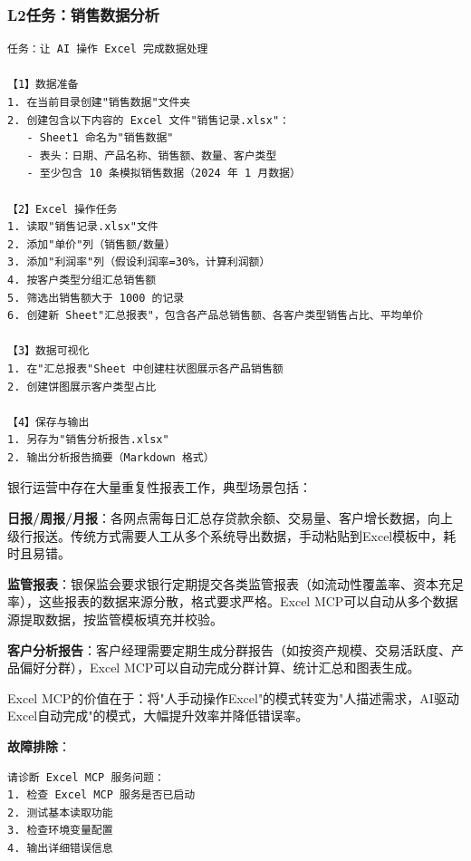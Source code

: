\subsubsection{L2任务：销售数据分析}

\begin{lstlisting}
任务：让 AI 操作 Excel 完成数据处理

【1】数据准备
1. 在当前目录创建"销售数据"文件夹
2. 创建包含以下内容的 Excel 文件"销售记录.xlsx"：
   - Sheet1 命名为"销售数据"
   - 表头：日期、产品名称、销售额、数量、客户类型
   - 至少包含 10 条模拟销售数据（2024 年 1 月数据）

【2】Excel 操作任务
1. 读取"销售记录.xlsx"文件
2. 添加"单价"列（销售额/数量）
3. 添加"利润率"列（假设利润率=30%，计算利润额）
4. 按客户类型分组汇总销售额
5. 筛选出销售额大于 1000 的记录
6. 创建新 Sheet"汇总报表"，包含各产品总销售额、各客户类型销售占比、平均单价

【3】数据可视化
1. 在"汇总报表"Sheet 中创建柱状图展示各产品销售额
2. 创建饼图展示客户类型占比

【4】保存与输出
1. 另存为"销售分析报告.xlsx"
2. 输出分析报告摘要（Markdown 格式）
\end{lstlisting}

\begin{theorybox}[银行运营中的报表自动化需求]
银行运营中存在大量重复性报表工作，典型场景包括：

\textbf{日报/周报/月报}：各网点需每日汇总存贷款余额、交易量、客户增长数据，向上级行报送。传统方式需要人工从多个系统导出数据，手动粘贴到Excel模板中，耗时且易错。

\textbf{监管报表}：银保监会要求银行定期提交各类监管报表（如流动性覆盖率、资本充足率），这些报表的数据来源分散，格式要求严格。Excel MCP可以自动从多个数据源提取数据，按监管模板填充并校验。

\textbf{客户分析报告}：客户经理需要定期生成分群报告（如按资产规模、交易活跃度、产品偏好分群），Excel MCP可以自动完成分群计算、统计汇总和图表生成。

Excel MCP的价值在于：将"人手动操作Excel"的模式转变为"人描述需求，AI驱动Excel自动完成"的模式，大幅提升效率并降低错误率。
\end{theorybox}

\textbf{故障排除}：

\begin{lstlisting}
请诊断 Excel MCP 服务问题：
1. 检查 Excel MCP 服务是否已启动
2. 测试基本读取功能
3. 检查环境变量配置
4. 输出详细错误信息
\end{lstlisting}

